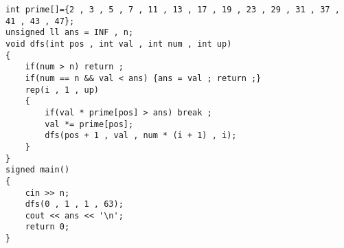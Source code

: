 \documentclass[E:/GsjzTle/main/main.tex]{subfiles}
\begin{document}
\begin{lstlisting}
int prime[]={2 , 3 , 5 , 7 , 11 , 13 , 17 , 19 , 23 , 29 , 31 , 37 , 41 , 43 , 47};
unsigned ll ans = INF , n;
void dfs(int pos , int val , int num , int up)
{
	if(num > n) return ;
	if(num == n && val < ans) {ans = val ; return ;} 
	rep(i , 1 , up)
	{
		if(val * prime[pos] > ans) break ;
		val *= prime[pos];
		dfs(pos + 1 , val , num * (i + 1) , i); 
	}
}
signed main()
{
	cin >> n;
	dfs(0 , 1 , 1 , 63);
	cout << ans << '\n'; 
	return 0;
}
\end{lstlisting}
\end{document}
